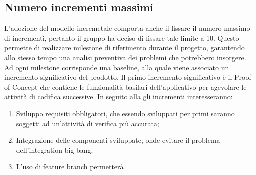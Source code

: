 \subsection{Numero incrementi massimi}
L'adozione del modello incremetale comporta anche il fissare il numero massimo di incrementi, pertanto il gruppo ha deciso di fissare tale limite a 10. Questo permette di realizzare {milestone} di riferimento durante il progetto, garantendo allo stesso tempo una analisi preventiva dei problemi che potrebbero insorgere. Ad ogni milestone corrisponde una baseline, alla quale viene associato un incremento significativo del prodotto. Il primo incremento significativo è il {Proof of Concept} che contiene le funzionalità basilari dell'applicativo per agevolare le attività di codifica successive. In seguito alla \RP{} gli incrementi interesseranno:
\begin{enumerate}
	\item Sviluppo requisiti obbligatori, che essendo sviluppati per primi saranno soggetti ad un'attività di verifica più accurata;
	\item Integrazione delle componenti sviluppate, onde evitare il problema dell'{integration big-bang};
	\item L'uso di {feature branch} permetterà 
\end{enumerate}